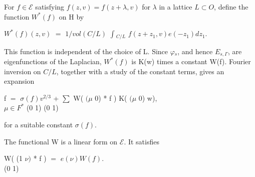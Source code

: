 \documentclass[10pt,a4paper]{article}
\begin{document}
\par For $f\in{}\mathcal{E}$ satisfying $f(z,v)=f(z+\lambda{},v)$ for $\lambda{}$ in a lattice $L\subset{}O$, define the function $W^*(f)$ on H by\par
\par $W^*(f)(z,v)$ $=$ $1/vol(C/L)$ $\int{}_{C/L}$ $f(z+z_1,v)e(-z_1)dz_1$.\par
\par This function is independent of the choice of L. Since $\varphi{}_s$, and hence $E_{s,\Gamma{}}$, are eigenfunctions of the Laplacian, $W^*(f)$ is K(w) times a constant W(f). Fourier inversion on $C/L$, together with a study of the constant terms, gives an expansion\par
\par\smallskip\begin{center}\begin{minipage}{0.96\textwidth}\centering
f $=$ $\sigma{}(f)v^{2/3}$ + $\sum{}$ W( $(\mu{}$ 0) * f ) K( $(\mu{}$ 0) w), \\ $\mu{}\in{}F^*$ (0 1) (0 1)
\end{minipage}\end{center}\smallskip
\par for a suitable constant $\sigma{}(f)$.\par
\par The functional W is a linear form on $\mathcal{E}$. It satisfies\par
\par\smallskip\begin{center}\begin{minipage}{0.96\textwidth}\centering
W( (1 $\nu{})$ * f ) $=$ $e(\nu{})W(f)$. \\ (0 1)
\end{minipage}\end{center}\smallskip
\end{document}
